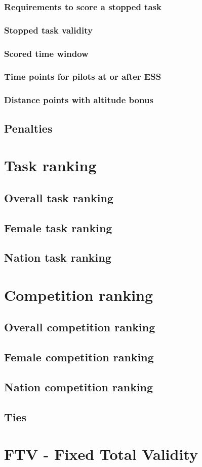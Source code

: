 \documentclass{article}
\begin{document}
\subsubsection{Requirements to score a stopped task}
\subsubsection{Stopped task validity}
\subsubsection{Scored time window}
\subsubsection{Time points for pilots at or after ESS}
\subsubsection{Distance points with altitude bonus}
\label{sec:distance-stopped-tasks}
\subsection{Penalties}

\newpage
\section{Task ranking}
\subsection{Overall task ranking}
\subsection{Female task ranking}
\subsection{Nation task ranking}

\newpage
\section{Competition ranking}
\subsection{Overall competition ranking}
\subsection{Female competition ranking}
\subsection{Nation competition ranking}
\subsection{Ties}

\newpage
\section{FTV - Fixed Total Validity}
\end{document}
